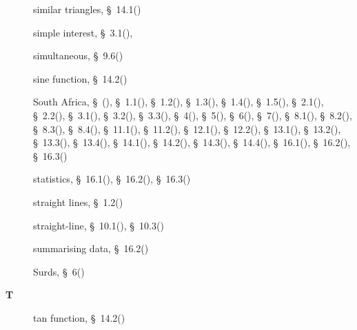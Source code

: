 \begin{multicols}{2}
{\begin{description}
	  \item[] \noindent\raggedright similar triangles,  \S~14.1(\pageref{m39405})
	  
	  \item[] \noindent\raggedright simple interest,  \S~3.1(\pageref{m39332}),  \pageref{id2476740}
	  
	  \item[] \noindent\raggedright simultaneous,  \S~9.6(\pageref{m39257})
	  
	  \item[] \noindent\raggedright sine function,  \S~14.2(\pageref{m39408})
	  
	  \item[] \noindent\raggedright South Africa,  \S~(\pageref{m38346}),  \S~1.1(\pageref{m39337}),  \S~1.2(\pageref{m39338}),  \S~1.3(\pageref{m39345}),  \S~1.4(\pageref{m39341}),  \S~1.5(\pageref{m39348}),  \S~2.1(\pageref{m39364}),  \S~2.2(\pageref{m39362}),  \S~3.1(\pageref{m39332}),  \S~3.2(\pageref{m39334}),  \S~3.3(\pageref{m39335}),  \S~4(\pageref{m38348}),  \S~5(\pageref{m38359}),  \S~6(\pageref{m38347}),  \S~7(\pageref{m38349}),  \S~8.1(\pageref{m39383}),  \S~8.2(\pageref{m39387}),  \S~8.3(\pageref{m39394}),  \S~8.4(\pageref{m39392}),  \S~11.1(\pageref{m39377}),  \S~11.2(\pageref{m39373}),  \S~12.1(\pageref{m39370}),  \S~12.2(\pageref{m39368}),  \S~13.1(\pageref{m39354}),  \S~13.2(\pageref{m39352}),  \S~13.3(\pageref{m39357}),  \S~13.4(\pageref{m39358}),  \S~14.1(\pageref{m39405}),  \S~14.2(\pageref{m39408}),  \S~14.3(\pageref{m39411}),  \S~14.4(\pageref{m39414}),  \S~16.1(\pageref{m39403}),  \S~16.2(\pageref{m39400}),  \S~16.3(\pageref{m39404})
	  
	  \item[] \noindent\raggedright statistics,  \S~16.1(\pageref{m39403}),  \S~16.2(\pageref{m39400}),  \S~16.3(\pageref{m39404})
	  
	  \item[] \noindent\raggedright straight lines,  \S~1.2(\pageref{m39338})
	  
	  \item[] \noindent\raggedright straight-line,  \S~10.1(\pageref{m39213}),  \S~10.3(\pageref{m39240})
	  
	  \item[] \noindent\raggedright summarising data,  \S~16.2(\pageref{m39400})
	  
	  \item[] \noindent\raggedright Surds,  \S~6(\pageref{m38347})
	  \vspace{.3cm}
	  \item[{\large \bfseries T}]\noindent\raggedright
	  tan function,  \S~14.2(\pageref{m39408})
	  

\end{description}}
\end{multicols}
